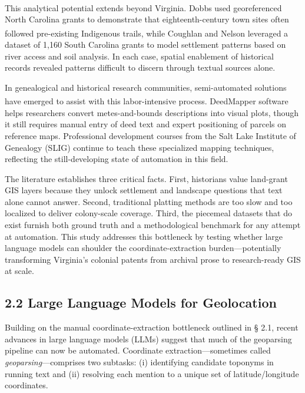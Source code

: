 \documentclass[
  10pt]{article}
\begin{document}
This analytical potential extends beyond Virginia.
Dobbs\textsuperscript{} used
georeferenced North Carolina grants to demonstrate that
eighteenth-century town sites often followed pre-existing Indigenous
trails, while Coughlan and
Nelson\textsuperscript{}
leveraged a dataset of 1,160 South Carolina grants to model settlement
patterns based on river access and soil analysis. In each case, spatial
enablement of historical records revealed patterns difficult to discern
through textual sources alone.

In genealogical and historical research communities, semi-automated
solutions have emerged to assist with this labor-intensive process.
DeedMapper
software\textsuperscript{} helps
researchers convert metes-and-bounds descriptions into visual plots,
though it still requires manual entry of deed text and expert
positioning of parcels on reference maps. Professional development
courses from the Salt Lake Institute of Genealogy (SLIG) continue to
teach these specialized mapping techniques, reflecting the
still-developing state of automation in this field.

The literature establishes three critical facts. First, historians value
land-grant GIS layers because they unlock settlement and landscape
questions that text alone cannot answer. Second, traditional platting
methods are too slow and too localized to deliver colony-scale coverage.
Third, the piecemeal datasets that do exist furnish both ground truth
and a methodological benchmark for any attempt at automation. This study
addresses this bottleneck by testing whether large language models can
shoulder the coordinate-extraction burden---potentially transforming
Virginia's colonial patents from archival prose to research-ready GIS at
scale.

\subsection{2.2 Large Language Models for
Geolocation}\label{large-language-models-for-geolocation}

Building on the manual coordinate-extraction bottleneck outlined in §
2.1, recent advances in large language models (LLMs) suggest that much
of the geoparsing pipeline can now be automated. Coordinate
extraction---sometimes called \emph{geoparsing}---comprises two
subtasks: (i) identifying candidate toponyms in running text and (ii)
resolving each mention to a unique set of latitude/longitude
coordinates.
\end{document}
